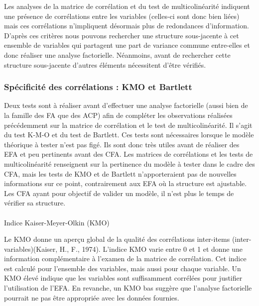 \documentclass[
  french,
  11pt,
  a4paper,
]{article}
\makeatletter
\let\oldparagraph\paragraph
\renewcommand{\paragraph}{
    \@ifstar
      \xxxParagraphStar
      \xxxParagraphNoStar
  }
\newcommand{\xxxParagraphStar}[1]{\oldparagraph*{#1}\mbox{}}
\newcommand{\xxxParagraphNoStar}[1]{\oldparagraph{#1}\mbox{}}
\makeatother
\begin{document}
Les analyses de la matrice de corrélation et du test de multicolinéarité
indiquent une présence de corrélations entre les variables (celles-ci
sont donc bien liées) mais ces corrélations n'impliquent désormais plus
de redondances d'information. D'après ces critères nous pouvons
rechercher une structure sous-jacente à cet ensemble de variables qui
partagent une part de variance commune entre-elles et donc réaliser une
analyse factorielle. Néanmoins, avant de rechercher cette structure
sous-jacente d'autres éléments nécessitent d'être vérifiés.

\subsubsection{Spécificité des corrélations : KMO et
Bartlett}\label{spuxe9cificituxe9-des-corruxe9lations-kmo-et-bartlett}

Deux tests sont à réaliser avant d'effectuer une analyse factorielle
(aussi bien de la famille des FA que des ACP) afin de compléter les
observations réalisées précédemment sur la matrice de corrélation et le
test de multicolinéarité. Il s'agit du test K-M-O et du test de
Bartlett. Ces tests sont nécessaires lorsque le modèle théorique à
tester n'est pas figé. Ils sont donc très utiles avant de réaliser des
EFA et peu pertinents avant des CFA. Les matrices de corrélations et les
tests de multicolinéarité renseignent sur la pertinence du modèle à
tester dans le cadre des CFA, mais les tests de KMO et de Bartlett
n'apporteraient pas de nouvelles informations sur ce point,
contrairement aux EFA où la structure est ajustable. Les CFA ayant pour
objectif de valider un modèle, il n'est plus le temps de vérifier sa
structure.

\paragraph{Indice Kaiser-Meyer-Olkin
(KMO)}\label{indice-kaiser-meyer-olkin-kmo}

Le KMO donne un aperçu global de la qualité des corrélations inter-items
(inter-variables)(Kaiser, H., F., 1974). L'indice KMO varie entre 0 et 1
et donne une information complémentaire à l'examen de la matrice de
corrélation. Cet indice est calculé pour l'ensemble des variables, mais
aussi pour chaque variable. Un KMO élevé indique que les variables sont
suffisamment corrélées pour justifier l'utilisation de l'EFA. En
revanche, un KMO bas suggère que l'analyse factorielle pourrait ne pas
être appropriée avec les données fournies.
\end{document}
